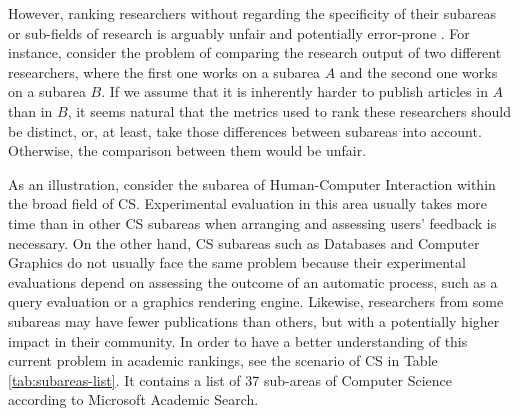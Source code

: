 \documentclass[msc]{ppgccufmg}
\begin{document}
However, ranking researchers without regarding the specificity of their subareas or sub-fields of research is arguably unfair and potentially error-prone \citep{lima2013jcdl}. For instance, consider the problem of comparing the research output of two different researchers, where the first one works on a subarea $A$ and the second one works on a subarea $B$. If we assume that it is inherently harder to publish articles in $A$ than in $B$, it seems natural that the metrics used to rank these researchers should be distinct, or, at least, take those differences between subareas into account. Otherwise, the comparison between them would be unfair.

As an illustration, consider the subarea of Human-Computer Interaction within the broad field of CS. Experimental evaluation in this area usually takes more time than in other CS subareas when arranging and assessing users' feedback is necessary. On the other hand, CS subareas such as Databases and Computer Graphics do not usually face the same problem because their experimental evaluations depend on assessing the outcome of an automatic process, such as a query evaluation or a graphics rendering engine. Likewise, researchers from some subareas may have fewer publications than others, but with a potentially higher impact in their community. In order to have a better understanding of this current problem in academic rankings, see the scenario of CS in Table \ref{tab:subareas-list}.  It contains a list of 37 sub-areas of Computer Science according to Microsoft Academic Search. 
\end{document}
